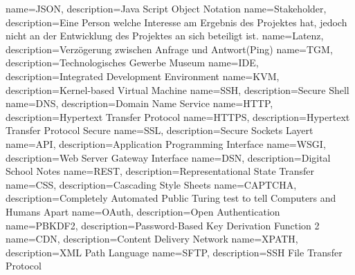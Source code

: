 \makeglossaries
{} {name=JSON, description={Java Script Object Notation}}
 {name=Stakeholder, description={Eine Person welche Interesse am Ergebnis des Projektes hat, jedoch nicht an der Entwicklung des Projektes an sich beteiligt ist.}}
 {name=Latenz, description={Verzögerung zwischen Anfrage und Antwort(Ping)}}
 {name=TGM, description={Technologisches Gewerbe Museum}}
 {name=IDE, description={Integrated Development Environment}}
 {name=KVM, description={Kernel-based Virtual Machine}}
 {name=SSH, description={Secure Shell}}
 {name=DNS, description={Domain Name Service}}
 {name=HTTP, description={Hypertext Transfer Protocol}}
 {name=HTTPS, description={Hypertext Transfer Protocol Secure}}
 {name=SSL, description={Secure Sockets Layert}}
 {name=API, description={Application Programming Interface}}
 {name=WSGI, description={Web Server Gateway Interface}}
 {name=DSN, description={Digital School Notes}}
 {name=REST, description={Representational State Transfer}}
 {name=CSS, description={Cascading Style Sheets}}
 {name=CAPTCHA, description={Completely Automated Public Turing test to tell Computers and Humans Apart}}
 {name=OAuth, description={Open Authentication}}
 {name=PBKDF2, description={Password-Based Key Derivation Function 2}}
 {name=CDN, description={Content Delivery Network}}
 {name=XPATH, description={XML Path Language}}
 {name=SFTP, description={SSH File Transfer Protocol}}

\renewcommand*\glspostdescription{\dotfill}


